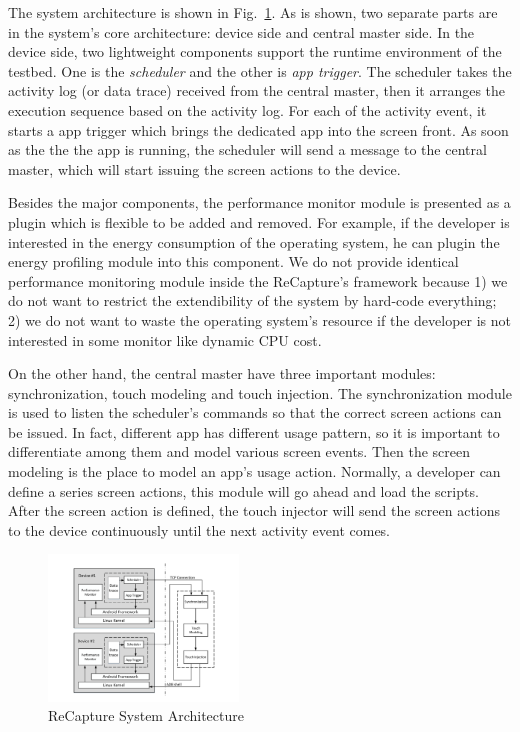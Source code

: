 The system architecture is shown in Fig.~\ref{fig:sys}. As is shown, two separate parts are in the system's core architecture: device side and central master side. In the device side, two lightweight components support the runtime environment of the testbed. One is the \emph{scheduler} and the other is \emph{app trigger}. The scheduler takes the activity log (or data trace) received from the central master, then it arranges the execution sequence based on the activity log. For each of the activity event, it starts a app trigger which brings the dedicated app into the screen front. As soon as the the the app is running, the scheduler will send a message to the central master, which will start issuing the screen actions to the device.

Besides the major components, the performance monitor module is presented as a plugin which is flexible to be added and removed. For example, if the developer is interested in the energy consumption of the operating system, he can plugin the energy profiling module into this component. We do not provide identical performance monitoring module inside the ReCapture's framework because 1) we do not want to restrict the extendibility of the system by hard-code everything; 2) we do not want to waste the operating system's resource if the developer is not interested in some monitor like dynamic CPU cost.

On the other hand, the central master have three important modules: synchronization, touch modeling and touch injection. The synchronization module is used to listen the scheduler's commands so that the correct screen actions can be issued. In fact, different app has different usage pattern, so it is important to differentiate among them and model various screen events. Then the screen modeling is the place to model an app's usage action. Normally, a developer can define a series screen actions, this module will go ahead and load the scripts. After the screen action is defined, the touch injector will send the screen actions to the device continuously until the next activity event comes.

\begin{figure}
\centering
\includegraphics[width=0.45\textwidth]{figures/sys-arch.pdf}
\caption{ReCapture System Architecture}
\label{fig:sys}
\end{figure}

